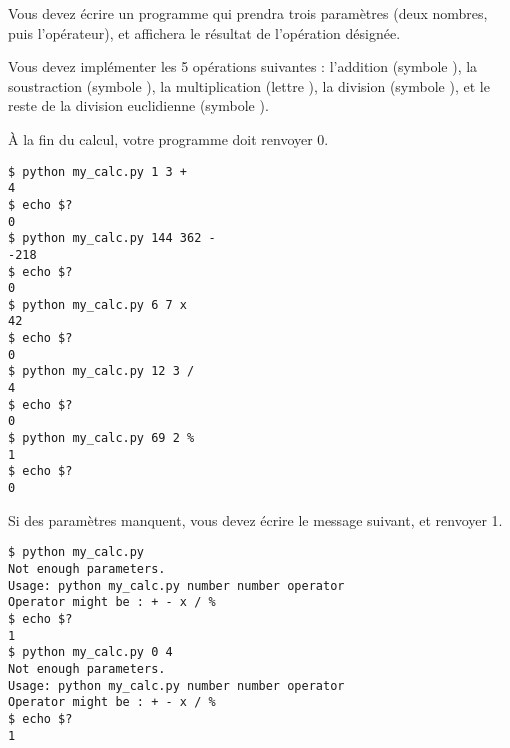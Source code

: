 

\vspace*{0.7cm}

\noindent {}

\bigskip

\noindent Vous devez écrire un programme qui prendra trois paramètres (deux nombres, puis l'opérateur), et affichera le résultat de l'opération désignée.

\noindent Vous devez implémenter les 5 opérations suivantes : l'addition (symbole \TTBF{+}), la soustraction (symbole \TTBF{-}), la multiplication (lettre ), la division (symbole \TTBF{/}), et le reste de la division euclidienne (symbole \TTBF{\%}).

\noindent \`A la fin du calcul, votre programme doit renvoyer 0.

\bigskip

\lstset{language=sh}
\begin{lstlisting}[frame=single,title={Cas général}]
$ python my_calc.py 1 3 +
4
$ echo $?
0
$ python my_calc.py 144 362 -
-218
$ echo $?
0
$ python my_calc.py 6 7 x
42
$ echo $?
0
$ python my_calc.py 12 3 /
4
$ echo $?
0
$ python my_calc.py 69 2 %
1
$ echo $?
0
\end{lstlisting}

\bigskip

\noindent Si des paramètres manquent, vous devez écrire le message suivant, et renvoyer 1.

\bigskip

\noindent {}

\noindent {}

\noindent {}

\bigskip

\lstset{language=sh}
\begin{lstlisting}[frame=single,title={Cas d'erreur 1 : pas assez de paramètres}]
$ python my_calc.py
Not enough parameters.
Usage: python my_calc.py number number operator
Operator might be : + - x / %
$ echo $?
1
$ python my_calc.py 0 4
Not enough parameters.
Usage: python my_calc.py number number operator
Operator might be : + - x / %
$ echo $?
1
\end{lstlisting}

